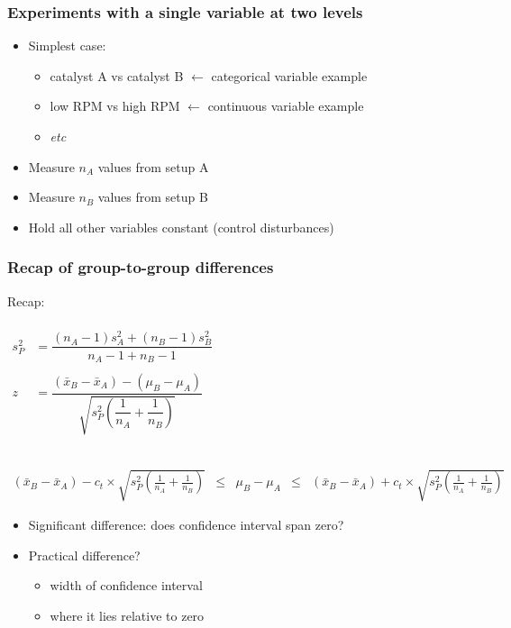 \begin{frame}\frametitle{Experiments with a single variable at two levels}
	\begin{itemize}
		\item	Simplest case:
		\begin{itemize}
			\item	catalyst A vs catalyst B \hfill {\color{myOrange} $\longleftarrow$ categorical variable example}
			\item	low RPM vs high RPM \hfill {\color{myOrange} $\longleftarrow$ continuous variable example}
			\item	\emph{etc}
		\end{itemize}
		\item	Measure $n_A$ values from setup A
		\item	Measure $n_B$ values from setup B
		\item	Hold all other variables constant (control disturbances)
	\end{itemize}
\end{frame}

\begin{frame}\frametitle{Recap of group-to-group differences}

	Recap:

	$
	\begin{array}{rcl}
		\\
		s_P^2 &= \dfrac{(n_A -1) s_A^2 + (n_B-1)s_B^2}{n_A - 1 + n_B - 1} \\
		& \\
		z &= \dfrac{(\bar{x}_B - \bar{x}_A) - (\mu_B - \mu_A)}{\sqrt{s_P^2 \left(\dfrac{1}{n_A} + \dfrac{1}{n_B}\right)}}\\
		\\
	\end{array}
	$

	$
	\begin{array}{rcccl}
		\\
		{\scriptstyle (\bar{x}_B - \bar{x}_A) - c_t} \times \sqrt{\scriptstyle s_P^2 \left(\frac{1}{n_A} + \frac{1}{n_B}\right)} &\leq& {\scriptstyle \mu_B - \mu_A} &\leq & {\scriptstyle (\bar{x}_B - \bar{x}_A) + c_t } \times \sqrt{\scriptstyle s_P^2 \left(\frac{1}{n_A} + \frac{1}{n_B}\right)}
	\end{array}
	$
	\begin{itemize}
		\item	Significant difference: does confidence interval span zero?
		\item	Practical difference?
		\begin{itemize}
			\item	width of confidence interval
			\item	where it lies relative to zero
		\end{itemize}
	\end{itemize}
\end{frame}

